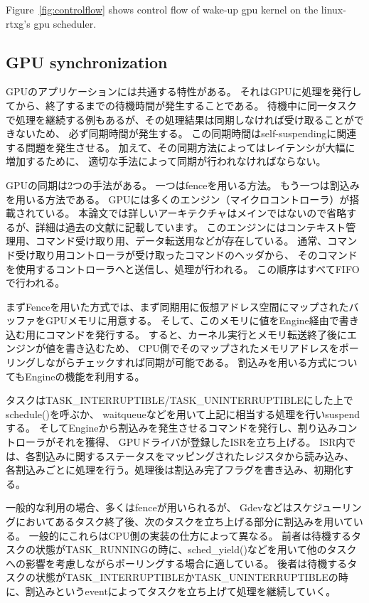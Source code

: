 Figure~\ref{fig:controlflow} shows control flow of wake-up gpu kernel on the linux-rtxg's gpu scheduler.



\subsection{GPU synchronization}
GPUのアプリケーションには共通する特性がある。
それはGPUに処理を発行してから、終了するまでの待機時間が発生することである。
待機中に同一タスクで処理を継続する例もあるが、その処理結果は同期しなければ受け取ることができないため、
必ず同期時間が発生する。
この同期時間はself-suspendingに関連する問題を発生させる。
加えて、その同期方法によってはレイテンシが大幅に増加するために、
適切な手法によって同期が行われなければならない。

GPUの同期は2つの手法がある。
一つはfenceを用いる方法。
もう一つは割込みを用いる方法である。
GPUには多くのエンジン（マイクロコントローラ）が搭載されている。
本論文では詳しいアーキテクチャはメインではないので省略するが、詳細は過去の文献\cite{timegraph,fucc}に記載しています。
このエンジンにはコンテキスト管理用、コマンド受け取り用、データ転送用などが存在している。
通常、コマンド受け取り用コントローラが受け取ったコマンドのヘッダから、
そのコマンドを使用するコントローラへと送信し、処理が行われる。
この順序はすべてFIFOで行われる。

まずFenceを用いた方式では、まず同期用に仮想アドレス空間にマップされたバッファをGPUメモリに用意する。
そして、このメモリに値をEngine経由で書き込む用にコマンドを発行する。
すると、カーネル実行とメモリ転送終了後にエンジンが値を書き込むため、
CPU側でそのマップされたメモリアドレスをポーリングしながらチェックすれば同期が可能である。
割込みを用いる方式についてもEngineの機能を利用する。

タスクはTASK\_INTERRUPTIBLE/TASK\_UNINTERRUPTIBLEにした上でschedule()を呼ぶか、
waitqueueなどを用いて上記に相当する処理を行いsuspendする。
そしてEngineから割込みを発生させるコマンドを発行し、割り込みコントローラがそれを獲得、
GPUドライバが登録したISRを立ち上げる。
ISR内では、各割込みに関するステータスをマッピングされたレジスタから読み込み、
各割込みごとに処理を行う。処理後は割込み完了フラグを書き込み、初期化する。

一般的な利用の場合、多くはfenceが用いられるが、
Gdevなどはスケジューリングにおいてあるタスク終了後、次のタスクを立ち上げる部分に割込みを用いている。
一般的にこれらはCPU側の実装の仕方によって異なる。
前者は待機するタスクの状態がTASK\_RUNNINGの時に、sched\_yield()などを用いて他のタスクへの影響を考慮しながらポーリングする場合に適している。
後者は待機するタスクの状態がTASK\_INTERRUPTIBLEかTASK\_UNINTERRUPTIBLEの時に、割込みというeventによってタスクを立ち上げて処理を継続していく。

